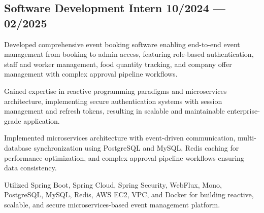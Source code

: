 \subsection{{Software Development Intern \hfill 10/2024 --- 02/2025}}
\begin{zitemize}
    \item Developed comprehensive event booking software enabling end-to-end event management from booking to admin access, featuring role-based authentication, staff and worker management, food quantity tracking, and company offer management with complex approval pipeline workflows.
    \item Gained expertise in reactive programming paradigms and microservices architecture, implementing secure authentication systems with session management and refresh tokens, resulting in scalable and maintainable enterprise-grade application.
    \item Implemented microservices architecture with event-driven communication, multi-database synchronization using PostgreSQL and MySQL, Redis caching for performance optimization, and complex approval pipeline workflows ensuring data consistency.
    \item Utilized Spring Boot, Spring Cloud, Spring Security, WebFlux, Mono, PostgreSQL, MySQL, Redis, AWS EC2, VPC, and Docker for building reactive, scalable, and secure microservices-based event management platform.
\end{zitemize}


